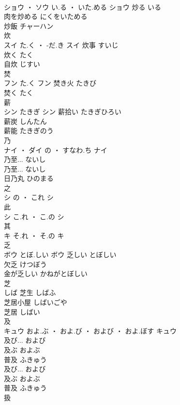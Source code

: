 \documentclass[8pt]{extreport}
\begin{document}
\begin{CJK}{UTF8}{min}
\\	ショウ ・ ソウ	い.る ・ いた.める	ショウ	炒る	いる	
\\	肉を炒める	にくをいためる	
\\	炒飯	チャーハン	
\\	炊	
\\	スイ	た.く ・ -だ.き	スイ	炊事	すいじ	
\\	炊く	たく	
\\	自炊	じすい	
\\	焚	
\\	フン	た.く	フン	焚き火	たきび	
\\	焚く	たく	
\\	薪	
\\	シン	たきぎ	シン	薪拾い	たきぎひろい	
\\	薪炭	しんたん	
\\	薪能	たきぎのう	
\\	乃	
\\	ナイ ・ ダイ	の ・ すなわ.ち	ナイ	
\\	乃至...	ないし	
\\	乃至...	ないし	
\\	日乃丸	ひのまる	
\\	之	
\\	シ	の ・ これ	シ																																			
\\	此	
\\	シ	こ.れ ・ こ.の	シ																																			
\\	其	
\\	キ	そ.れ ・ そ.の	キ																																			
\\	乏	
\\	ボウ	とぼ.しい	ボウ	乏しい	とぼしい	
\\	欠乏	けつぼう	
\\	金が乏しい	かねがとぼしい	
\\	芝	
\\	しば		芝生	しばふ	
\\	芝居小屋	しばいごや	
\\	芝居	しばい	
\\	及	
\\	キュウ	およ.ぶ ・ およ.び ・ および ・ およ.ぼす	キュウ	
\\	及び...	および	
\\	及ぶ	およぶ	
\\	普及	ふきゅう	
\\	及び...	および	
\\	及ぶ	およぶ	
\\	普及	ふきゅう	
\\	扱	

\end{CJK}
\end{document}
